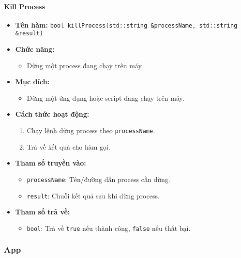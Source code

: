 \paragraph{Kill Process}
\begin{itemize}
    \item \textbf{Tên hàm:} \texttt{bool killProcess(std::string \&processName, std::string \&result)}
    \item \textbf{Chức năng:}
    \begin{itemize}
        \item Dừng một process đang chạy trên máy.
    \end{itemize}
    \item \textbf{Mục đích:}
    \begin{itemize}
        \item Dừng một ứng dụng hoặc script đang chạy trên máy.
    \end{itemize}
    \item \textbf{Cách thức hoạt động:}
    \begin{enumerate}
        \item Chạy lệnh dừng process theo \texttt{processName}.
        \item Trả về kết quả cho hàm gọi.
    \end{enumerate}
    \item \textbf{Tham số truyền vào:}
    \begin{itemize}
        \item \texttt{processName}: Tên/đường dẫn process cần dừng.
        \item \texttt{result}: Chuỗi kết quả sau khi dừng process.
    \end{itemize}
    \item \textbf{Tham số trả về:}
    \begin{itemize}
        \item \texttt{bool}: Trả về \texttt{true} nếu thành công, \texttt{false} nếu thất bại.
    \end{itemize}
\end{itemize}

\subsubsection{App}
\label{subsec:app}

